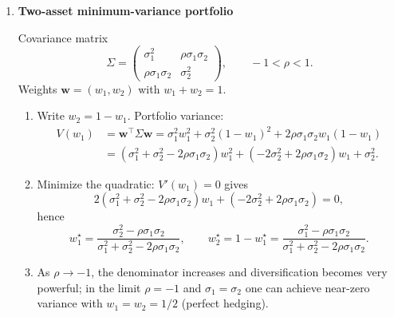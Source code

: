 \documentclass[11pt]{article}
\begin{document}
\begin{enumerate}
\begin{enumerate}[label=(\alph*)]
\item \textbf{Counterexample: zero covariance but not independent.}

Let $X$ take values $\{-1,1\}$ with $\mathbb{P}(X=1)=\mathbb{P}(X=-1)=1/2$
(symmetric). Define $Y=X^2$.
Then $Y\equiv 1$ is constant, so $X$ and $Y$ are clearly not independent (indeed $Y$ is a function of $X$).
Compute covariance:
\[
\mathbb{E}[X]=0,\quad \mathbb{E}[Y]=1,\quad \mathbb{E}[XY]=\mathbb{E}[X\cdot 1]=\mathbb{E}[X]=0.
\]
Hence
\[
\mathrm{Cov}(X,Y)=\mathbb{E}[XY]-\mathbb{E}[X]\mathbb{E}[Y]=0-0\cdot 1=0,
\]
yet $X$ and $Y$ are not independent.
\end{enumerate}

\item \textbf{Two-asset minimum-variance portfolio}

Covariance matrix
\[
\Sigma=
\begin{pmatrix}
\sigma_1^2 & \rho\sigma_1\sigma_2\\
\rho\sigma_1\sigma_2 & \sigma_2^2
\end{pmatrix},
\qquad -1<\rho<1.
\]
Weights $\bm{w}=(w_1,w_2)$ with $w_1+w_2=1$.

\begin{enumerate}[label=(\alph*)]
\item Write $w_2=1-w_1$. Portfolio variance:
\begin{align*}
V(w_1)
&=
\bm{w}^\top\Sigma\bm{w}
=
\sigma_1^2 w_1^2 + \sigma_2^2(1-w_1)^2 + 2\rho\sigma_1\sigma_2 w_1(1-w_1)\\
&=
(\sigma_1^2+\sigma_2^2-2\rho\sigma_1\sigma_2)w_1^2
+(-2\sigma_2^2+2\rho\sigma_1\sigma_2)w_1+\sigma_2^2.
\end{align*}

\item Minimize the quadratic: $V'(w_1)=0$ gives
\[
2(\sigma_1^2+\sigma_2^2-2\rho\sigma_1\sigma_2)w_1+(-2\sigma_2^2+2\rho\sigma_1\sigma_2)=0,
\]
hence
\[
\boxed{\;
w_1^\star=\frac{\sigma_2^2-\rho\sigma_1\sigma_2}{\sigma_1^2+\sigma_2^2-2\rho\sigma_1\sigma_2},
\qquad
w_2^\star=1-w_1^\star=\frac{\sigma_1^2-\rho\sigma_1\sigma_2}{\sigma_1^2+\sigma_2^2-2\rho\sigma_1\sigma_2}.
\;}
\]

\item As $\rho\to -1$, the denominator increases and diversification becomes very powerful; in the limit $\rho=-1$ and $\sigma_1=\sigma_2$ one can achieve near-zero variance with $w_1=w_2=1/2$ (perfect hedging).
\end{enumerate}


\end{enumerate}
\end{document}
